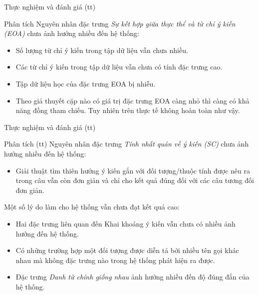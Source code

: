 \documentclass{beamer}
\begin{document}
		\begin{frame}{Thực nghiệm và đánh giá (tt)}			
			\begin{block}{Phân tích}
				Nguyên nhân đặc trưng \textit{Sự kết hợp giữa thực thể và từ chỉ ý kiến (EOA)} chưa ảnh hưởng nhiều đến hệ thống:
				\begin{itemize}
					\item{Số lượng từ chỉ ý kiến trong tập dữ liệu vẫn chưa nhiều.}
					\item{Các từ chỉ ý kiến trong tập dữ liệu vẫn chưa có tính đặc trưng cao.}
					\item{Tập dữ liệu học của đặc trưng EOA bị nhiễu.}
					\item{Theo giả thuyết cặp nào có giá trị đặc trưng EOA càng nhỏ thì càng có khả năng đồng tham chiếu. Tuy nhiên trên thực tế không hoàn toàn như vậy.}
				\end{itemize}												
			\end{block}				
		\end{frame}

		\begin{frame}{Thực nghiệm và đánh giá (tt)}			
			\begin{block}{Phân tích (tt)}					
				Nguyên nhân đặc trưng \textit{Tính nhất quán về ý kiến (SC)} chưa ảnh hưởng nhiều đến hệ thống:
				\begin{itemize}
					\item{Giải thuật tìm thiên hướng ý kiến gắn với đối tượng/thuộc tính được nêu ra trong câu vẫn còn đơn giản và chỉ cho kết quả đúng đối với các câu tương đối đơn giản.}	
				\end{itemize}							
				Một số lý do làm cho hệ thống vẫn chưa đạt kết quả cao:
				\begin{itemize}
					\item{Hai đặc trưng liên quan đến Khai khoáng ý kiến vẫn chưa có nhiều ảnh hưởng đến hệ thống.}
					\item{Có những trường hợp một đối tượng được diễn tả bởi nhiều tên gọi khác nhau mà không đặc trưng nào trong hệ thống phát hiện ra được.}
					\item{Đặc trưng \textit{Danh từ chính giống nhau} ảnh hưởng nhiều đến độ đúng đắn của hệ thống.}
				\end{itemize}				
			\end{block}						
		\end{frame}
\end{document}
